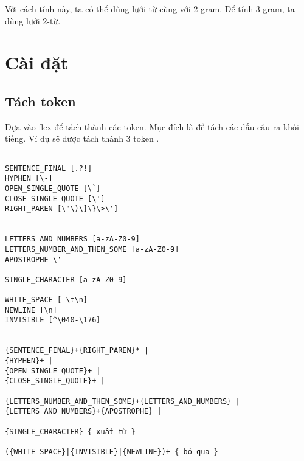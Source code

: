 \documentclass[a4paper,oneside,14pt]{extbook} %
\newcommand{\note}[1]{\underline{#1}}
\begin{document}
Với cách tính này, ta có thể dùng lưới từ cùng với 2-gram. Để tính
3-gram, ta dùng lưới 2-từ. 








\chapter{Cài đặt}
\label{cha:implementation}
\minitoc

\section{Tách token}
\label{sub:preprocess:token}

Dựa vào flex để tách thành các token. Mục đích là để tách các dấu câu
ra khỏi tiếng. Ví dụ  sẽ được tách thành 3 token
  . 

\begin{verbatim}

SENTENCE_FINAL [.?!]
HYPHEN [\-]
OPEN_SINGLE_QUOTE [\`]
CLOSE_SINGLE_QUOTE [\']
RIGHT_PAREN [\"\)\]\}\>\']


LETTERS_AND_NUMBERS [a-zA-Z0-9]
LETTERS_NUMBER_AND_THEN_SOME [a-zA-Z0-9]
APOSTROPHE \'

SINGLE_CHARACTER [a-zA-Z0-9]

WHITE_SPACE [ \t\n]
NEWLINE [\n]
INVISIBLE [^\040-\176]


{SENTENCE_FINAL}+{RIGHT_PAREN}* |
{HYPHEN}+ |
{OPEN_SINGLE_QUOTE}+ |
{CLOSE_SINGLE_QUOTE}+ |

{LETTERS_NUMBER_AND_THEN_SOME}+{LETTERS_AND_NUMBERS} |
{LETTERS_AND_NUMBERS}+{APOSTROPHE} |

{SINGLE_CHARACTER} { xuất từ }

({WHITE_SPACE}|{INVISIBLE}|{NEWLINE})+ { bỏ qua }

\end{verbatim}
\end{document}
